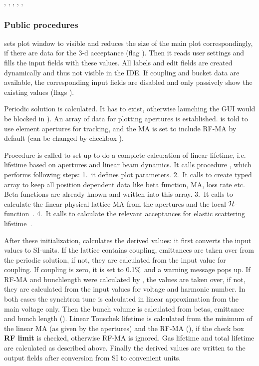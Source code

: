 \documentclass[12pt]{article}
\newcommand\code[1]{{\tt #1}}
\newcommand{\ofld}[1]{\colorbox{black!15}{{{\color{black}\bf #1}}}}
\newcommand\guico[1]{{\color{blue}\code{#1}}}
\newcommand{\unico}[1]{{\color{burntorange}\code{#1}}}
\newcommand{\opagui}[1]{\colorbox{blue!20}{{\color{black}\code{#1}}}}
\newcommand{\ogui}[1]{\hyperref[#1]{\opagui{#1}}}
\newcommand{\opaguif}[1]{\colorbox{violet!30}{{\color{black}\code{#1}}}}
\newcommand{\oguif}[1]{\hyperref[#1]{\opaguif{#1}}}
\newcommand{\opauni}[1]{\colorbox{orange!30}{{\color{black}\code{#1}}}}
\newcommand{\ouni}[1]{\hyperref[#1]{\opauni{#1}}}
\newcommand{\uses}[1]{\flushleft {\bf Uses:} #1}
\newcommand{\ppro}[1]{\subsubsection*{Public procedures} #1}
\begin{document}
\uses{\ouni{tracklib}, \ouni{linoplib}, \ouni{globlib} \ouni{mathlib}, \oguif{../com/asfigure}, \ouni{../com/vgraph}, \ouni{../com/asaux}}

\ppro{
\guico{Start} sets plot window \guico{flofig} to visible and reduces the size of the main plot \guico{fig} correspondingly, if there are data for the 3-d acceptance (flag \unico{status.FloPoly}). Then it reads user settings and fills the input fields with these values. 
All labels and edit fields are created dynamically and thus not visible in the IDE. If coupling and bucket data are available, the corresponding input fields are disabled and only passively show the existing values (flags \unico{status.uncoupled, .rfaccept}). 

Periodic solution is calculated. It has to exist, otherwise launching the GUI would be blocked in \ogui{opamenu}). An array of data for plotting apertures is established. \ouni{tracklib} is told to use element apertures for tracking, and the MA is set to include RF-MA by default (can be changed by checkbox \guico{chkRFL}). 

Procedure \guico{Output} is called to set up to do a complete calcu;ation of linear lifetime, i.e. lifetime based on apertures and linear beam dynamics. It calls procedure \guico{CalcBeta}, which performs following steps: 1.~it defines plot parameters. 2.~It calls \guico{InitSigma} to create typed array \guico{tsig} to keep all position dependent data like beta function, MA, loss rate etc. Beta functions are already known and written into this array. 3.~It calls \guico{CalcMAlin} to calculate the linear physical lattice MA from the apertures and the local $\cal H$-function~\cite{inside}. 4.~It calls \guico{CalcAccEL} to calculate the relevant acceptances for elastic scattering lifetime~\cite{inside}.

After these initialization, \guico{Output} calculates the derived values: it first converts the input values to SI-units. If the lattice contains coupling, emittances are taken over from the periodic solution, if not, they are calculated from the input value for coupling. If coupling is zero, it is set to 0.1\%\ and a warning message pops up. If RF-MA and bunchlength were calculated by \ogui{opabucket}, the values are taken over, if not, they are calculated from the input values for voltage and harmonic number. In both cases the synchtron tune is calculated in linear approximation from the main voltage only. Then the bunch volume is calculated from betas, emittance and bunch length (\guico{CalcSigma}). Linear Touschek lifetime is calculated from the minimum of the linear MA (as given by the apertures) and the RF-MA (\guico{CalcLifetime}), if the check box \ofld{RF limit} is checked, otherwise RF-MA is ignored. Gas lifetime and total lifetime are calculated as described above. Finally the derived values are written to the output fields after conversion from SI to convenient units.
}
\end{document}
